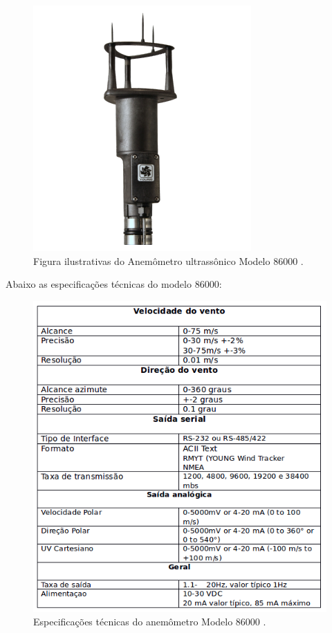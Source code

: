   \begin{figure}[!htbp]
    \centering
    \includegraphics[scale=0.5]{editaveis/figuras/anemometro}
    \caption[Anemômetro ultrassônico Modelo 86000]
    {Figura ilustrativas do Anemômetro ultrassônico Modelo 86000 \footnotemark .}
    \label{anemometro}
  \end{figure}
  
  Abaixo as especificações técnicas do modelo 86000:
  
  \begin{figure}[!htbp]
    \centering
    \includegraphics[scale=0.5]{editaveis/figuras/anemometro_spec}
    \caption[Especificações técnicas do anemômetro Modelo 86000]
    {Especificações técnicas do anemômetro Modelo 86000 \footnotemark .}
    \label{anemometro_spec}
  \end{figure}
  
  
  